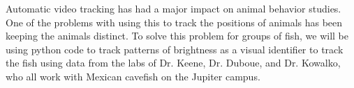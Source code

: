 \documentclass{article}
\makeatletter
\renewcommand\section{\clearpage\newpage\@startsection {section}{1}{\z@}%
	{-3.5ex \@plus -1ex \@minus -.2ex}%
	{2.3ex \@plus.2ex}%
	{\normalfont\Large\bfseries}}
\makeatother
\begin{document}

Automatic video tracking has had a major impact on animal behavior studies. One of the problems with using this to track the positions of animals has been keeping the animals distinct. To solve this problem for groups of fish, we will be using python code to track patterns of brightness as a visual identifier to track the fish using data from the labs of Dr. Keene, Dr. Duboue, and Dr. Kowalko, who all work with Mexican cavefish on the Jupiter campus.
\end{document}
